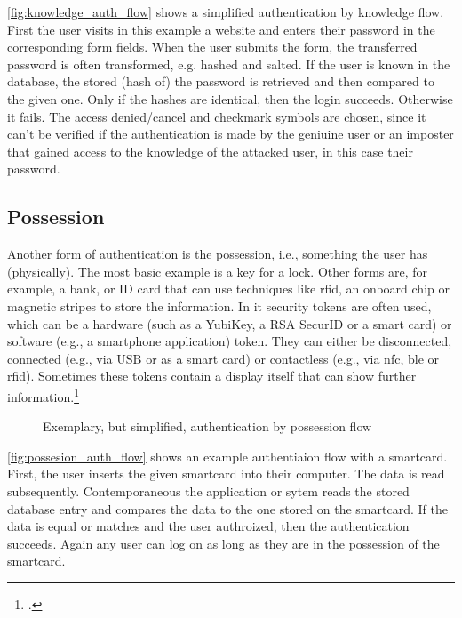 \autoref{fig:knowledge_auth_flow} shows a simplified authentication by knowledge flow. First the user visits in this example a website and enters their password in the corresponding form fields. When the user submits the form, the transferred password is often transformed, e.g. hashed and salted. If the user is known in the database, the stored (hash of) the password is retrieved and then compared to the given one. Only if the hashes are identical, then the login succeeds. Otherwise it fails. The \frqq access denied/cancel\flqq{} and \frqq checkmark\flqq{} symbols are chosen, since it can't be verified if the authentication is made by the geniuine user or an imposter that gained access to the knowledge of the attacked user, in this case their password.

\subsection{Possession}

Another form of authentication is the possession, i.e., \frqq something the user has\flqq{} (physically). The most basic example is a key for a lock. Other forms are, for example, a bank, or ID card that can use techniques like \gls{rfid}, an onboard chip or magnetic stripes to store the information. In \gls{it} security tokens are often used, which can be a hardware (such as a YubiKey, a RSA SecurID or a smart card) or software (e.g., a smartphone application) token. They can either be disconnected, connected (e.g., via USB or as a smart card) or contactless (e.g., via \gls{nfc}, \gls{ble} or \gls{rfid}). Sometimes these tokens contain a display itself that can show further information.\footcites[See][24]{265831}[][]{Dressel:2019:SZT:3319499.3328225}[See][8--11]{1698485}

\begin{figure}[hbt]
	\centering
	
	\caption[Exemplary, but simplified, authentication by possession flow]{Exemplary, but simplified, authentication by possession flow\footnotemark}
	\label{fig:possesion_auth_flow}
\end{figure}

\autoref{fig:possesion_auth_flow} shows an example authentiaion flow with a smartcard. First, the user inserts the given smartcard into their computer. The data is read subsequently. Contemporaneous the application or sytem reads the stored database entry and compares the data to the one stored on the smartcard. If the data is equal or matches and the user authroized, then the authentication succeeds. Again any user can log on as long as they are in the possession of the smartcard.

